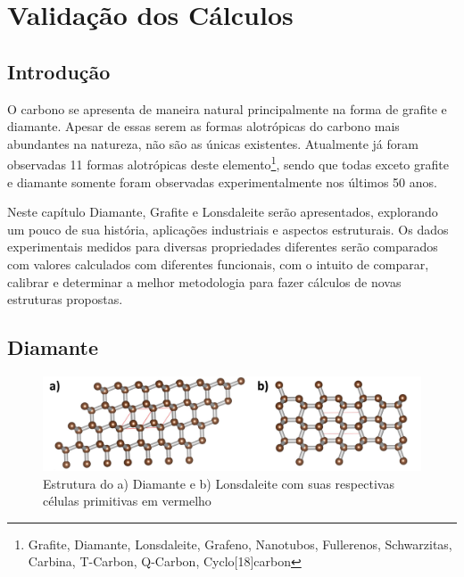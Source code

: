 
\chapter{Validação dos Cálculos}
	\label{calculos_exp}

	\section{Introdução}
		
		O carbono se apresenta de maneira natural principalmente na forma de grafite e diamante. Apesar de essas serem as formas alotrópicas do carbono mais abundantes na natureza, não são as únicas existentes. Atualmente já foram observadas 11 formas alotrópicas deste elemento\footnote{Grafite, Diamante, Lonsdaleite, Grafeno, Nanotubos, Fullerenos, Schwarzitas, Carbina, T-Carbon, Q-Carbon, Cyclo[18]carbon}, sendo que todas exceto grafite e diamante somente foram observadas experimentalmente nos últimos 50 anos. 
		
		Neste capítulo Diamante, Grafite e Lonsdaleite serão apresentados, explorando um pouco de sua história, aplicações industriais e aspectos estruturais. Os dados experimentais medidos para diversas propriedades diferentes serão comparados com valores calculados com diferentes funcionais, com o intuito de comparar, calibrar e determinar a melhor metodologia para fazer cálculos de novas estruturas propostas.
		
	\section{Diamante}
	
		\begin{figure}[!h]
			\centering
			\includegraphics[width=1.\linewidth]{capitulos/fig/results0/diamante_losndaleite}
			\caption{Estrutura do a) Diamante e b) Lonsdaleite com suas respectivas células primitivas em vermelho}
			\label{diamante_lonsdaleite}
		\end{figure}

